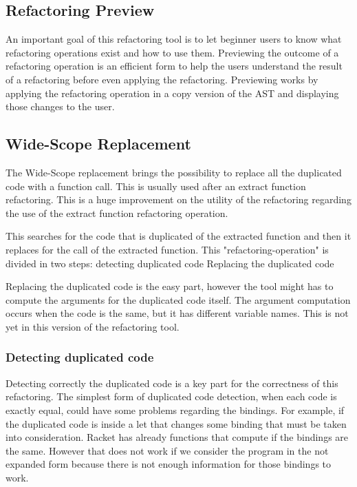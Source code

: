 \subsection{Refactoring Preview}
An important goal of this refactoring tool is to let beginner users to know what
refactoring operations exist and how to use them.
Previewing the outcome of a refactoring operation is an efficient form to
help the users understand the result of a refactoring before even applying the refactoring. %
Previewing works by applying the refactoring operation in a copy version of the AST
and displaying those changes to the user.

\subsection{Wide-Scope Replacement} %
The Wide-Scope replacement brings the possibility to replace all the duplicated
code with a function call. This is usually used after an extract function refactoring.
This is a huge improvement on the utility of the refactoring regarding the use
of the extract function refactoring operation.

This searches for the code that is duplicated of the extracted function and then it replaces for the call of the
extracted function.
This "refactoring-operation" is divided in two steps:
detecting duplicated code
Replacing the duplicated code

Replacing the duplicated code is the easy part, however the tool might has to compute
the arguments for the duplicated code itself. The argument computation occurs when
the code is the same, but it has different variable names. This is not yet in this
version of the refactoring tool.

\subsubsection{Detecting duplicated code}
Detecting correctly the duplicated code is a key part for the correctness of this refactoring.
The simplest form of duplicated code detection, when each code is exactly equal,
could have some problems regarding the bindings.
For example, if the duplicated code is inside a let that changes some binding that must
be taken into consideration.
Racket has already functions that compute if the bindings are the same.
However that does not work if we consider the program in the not expanded
form because there is not enough information for those bindings to work.

